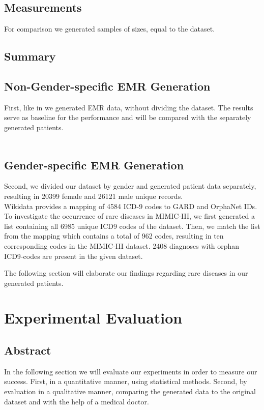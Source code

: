 \documentclass[11pt, a4paper]{book}
\begin{document}
\section{Measurements}
For comparison we generated samples of sizes, equal to the dataset.

\section{Summary}

\section{Non-Gender-specific EMR Generation}
First, like in \cite{Choi2017} we generated EMR data, without dividing the dataset. The results serve as baseline for the performance and will be compared with the separately generated patients.
\\
\\



\section{Gender-specific EMR Generation}
Second, we divided our dataset by gender and generated patient data separately, resulting in 20399 female and 26121 male unique records.
\\
Wikidata provides a mapping of 4584 ICD-9 codes to GARD and OrphaNet IDs.
To investigate the occurrence of rare diseases in MIMIC-III, we first generated a list containing all 6985 unique ICD9 codes of the dataset. Then, we match the list from the mapping which contains a total of 962 codes, resulting in ten corresponding codes in the MIMIC-III dataset. 2408 diagnoses with orphan ICD9-codes are present in the given dataset.

The following section will elaborate our findings regarding rare diseases in our generated patients.
\chapter{Experimental Evaluation}
\section{Abstract}
In the following section we will evaluate our experiments in order to measure our success. First, in a quantitative manner, using statistical methods. Second, by evaluation in a qualitative manner, comparing the generated data to the original dataset and with the help of a medical doctor.
\end{document}
